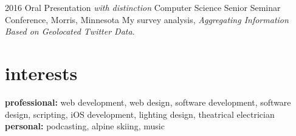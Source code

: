 \documentclass[]{cv-style} %
\begin{document}
\begin{entrylist}


\entry
{2016}
{Oral Presentation {\normalfont \emph{with distinction}}}
{Computer Science Senior Seminar Conference, Morris, Minnesota}
{My survey analysis, \emph{Aggregating Information Based on Geolocated Twitter Data}.}


\end{entrylist}


%
%
%
%
%


\section{interests}

\textbf{professional:} web development, web design, software development, software design, scripting, iOS development, lighting design, theatrical electrician \textbf{personal:} podcasting, alpine skiing, music
\end{document}
